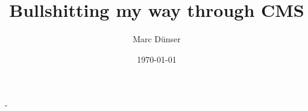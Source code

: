 \documentclass[11pt,a4paper,titlepage]{memoir} %
\title{Bullshitting my way through CMS}
\author{Marc D\"unser}
\date{\today}
\begin{document}
\frontmatter

\begin{titlingpage}
  \calccentering{\unitlength}
  \begin{adjustwidth*}{\unitlength-24pt}{-\unitlength-24pt}
    \maketitle
  \end{adjustwidth*}
\end{titlingpage}



\cleartorecto
\tableofcontents
\mainmatter









\appendix



\backmatter



\end{document}
